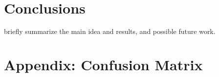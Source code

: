 \documentclass[10pt,twocolumn,letterpaper]{article}
\begin{document}
\section{Conclusions}

briefly summarize the main idea and results, and possible future work.

{\small


}

\appendix
\section*{Appendix: Confusion Matrix}

\label{sec:appendix}

\end{document}
